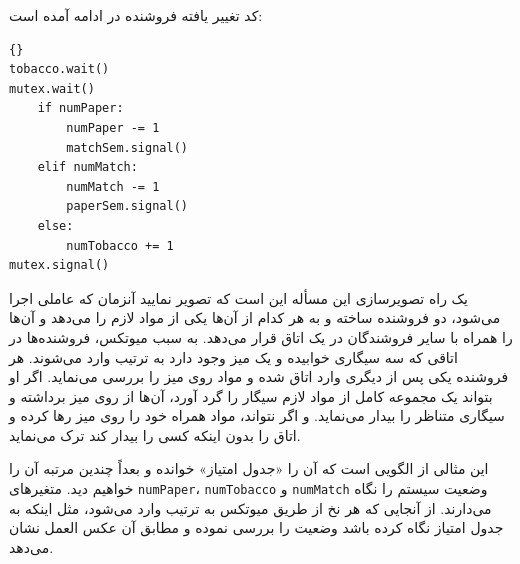 \documentclass{book}
\begin{document}
    کد تغییر یافته فروشنده  در ادامه آمده است: 

\begin{latin}
\begin{lstlisting}[title={\rl{فروشنده} A}]{}
tobacco.wait()
mutex.wait()
    if numPaper:
        numPaper -= 1
        matchSem.signal()
    elif numMatch:
        numMatch -= 1
        paperSem.signal()
    else: 
        numTobacco += 1
mutex.signal()
\end{lstlisting}
\end{latin}

    یک راه تصویرسازی این مسأله این است که تصویر نمایید آنزمان که عاملی اجرا می‌شود‌، دو فروشنده ساخته و به هر کدام از آن‌ها یکی از مواد لازم را 
    می‌دهد و آن‌ها را همراه با سایر فروشندگان در یک اتاق قرار می‌دهد. به سبب میوتکس، فروشنده‌ها در اتاقی که سه سیگاری خوابیده و یک میز وجود دارد 
    به ترتیب وارد می‌شوند. هر فروشنده یکی پس از دیگری وارد اتاق شده و مواد روی میز را بررسی می‌نماید. اگر او بتواند یک مجموعه کامل از مواد لازم سیگار را
    گرد آورد، آن‌ها از روی میز برداشته و سیگاری متناظر را بیدار می‌نماید. و اگر نتواند،‌ مواد همراه خود را روی میز رها کرده و اتاق را بدون اینکه کسی را 
    بیدار کند ترک می‌نماید. 

    این مثالی از الگویی است که آن را «جدول امتیاز» خوانده و بعداً چندین مرتبه آن را خواهیم دید.   
    متغیرهای     {\tt numPaper}، {\tt numTobacco} و  {\tt numMatch}    وضعیت سیستم را نگاه می‌دارند. 
    از آنجایی که هر نخ از طریق میوتکس به ترتیب وارد می‌شود، مثل اینکه به جدول امتیاز نگاه کرده باشد وضعیت را بررسی نموده و مطابق آن عکس العمل نشان می‌دهد. 
\end{document}
